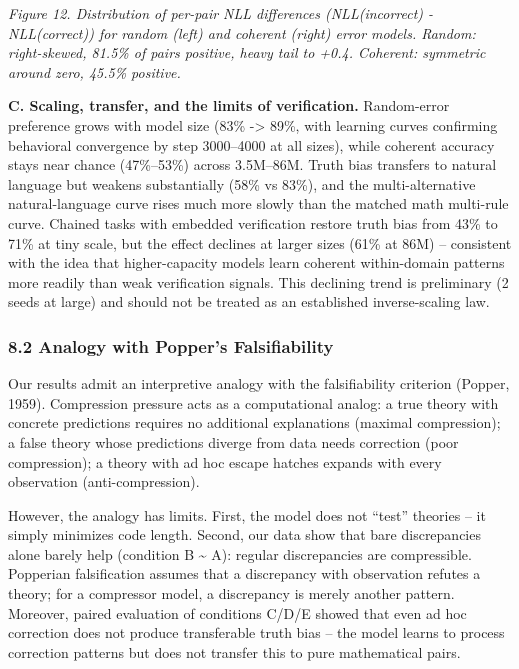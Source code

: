 \documentclass[
  11pt,
]{article}
\begin{document}
\emph{Figure 12. Distribution of per-pair NLL differences
(NLL(incorrect) - NLL(correct)) for random (left) and coherent (right)
error models. Random: right-skewed, 81.5\% of pairs positive, heavy tail
to +0.4. Coherent: symmetric around zero, 45.5\% positive.}

\textbf{C. Scaling, transfer, and the limits of verification.}
Random-error preference grows with model size (83\% -\textgreater{}
89\%, with learning curves confirming behavioral convergence by step
3000--4000 at all sizes), while coherent accuracy stays near chance
(47\%--53\%) across 3.5M--86M. Truth bias transfers to natural language
but weakens substantially (58\% vs 83\%), and the multi-alternative
natural-language curve rises much more slowly than the matched math
multi-rule curve. Chained tasks with embedded verification restore truth
bias from 43\% to 71\% at tiny scale, but the effect declines at larger
sizes (61\% at 86M) -- consistent with the idea that higher-capacity
models learn coherent within-domain patterns more readily than weak
verification signals. This declining trend is preliminary (2 seeds at
large) and should not be treated as an established inverse-scaling law.

\subsubsection{8.2 Analogy with Popper's
Falsifiability}\label{analogy-with-poppers-falsifiability}

Our results admit an interpretive analogy with the falsifiability
criterion (Popper, 1959). Compression pressure acts as a computational
analog: a true theory with concrete predictions requires no additional
explanations (maximal compression); a false theory whose predictions
diverge from data needs correction (poor compression); a theory with ad
hoc escape hatches expands with every observation (anti-compression).

However, the analogy has limits. First, the model does not ``test''
theories -- it simply minimizes code length. Second, our data show that
bare discrepancies alone barely help (condition B \textasciitilde{} A):
regular discrepancies are compressible. Popperian falsification assumes
that a discrepancy with observation refutes a theory; for a compressor
model, a discrepancy is merely another pattern. Moreover, paired
evaluation of conditions C/D/E showed that even ad hoc correction does
not produce transferable truth bias -- the model learns to process
correction patterns but does not transfer this to pure mathematical
pairs.
\end{document}
